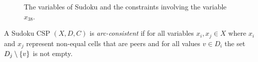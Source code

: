 \begin{center}
  \begin{figure}[ht]
    \centering
    \def\scale{.62} %
    
    \caption{The variables of Sudoku and the constraints involving the variable $x_{38}$.}
    \label{fig:variables}
  \end{figure}
\end{center}

\begin{definition}
A Sudoku CSP $(X,D,C)$ is \emph{arc-consistent} if for all variables $x_i,x_j \in X$ where $x_i$ and $x_j$ represent non-equal cells that are peers and for all values $v\in D_i$ the set $D_j \setminus \left\{v\right\}$ is not empty.
\end{definition}
